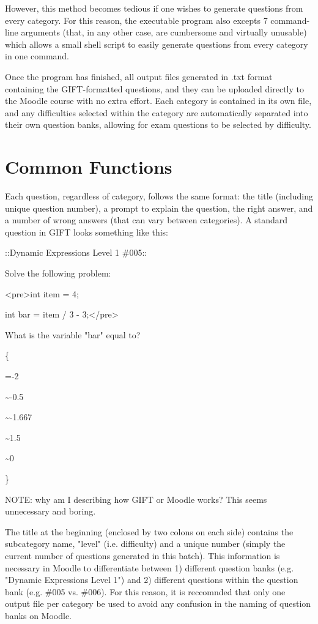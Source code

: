 \documentclass{article}
\begin{document}
However, this method becomes tedious if one wishes to generate questions from every category. For this reason, the
executable program also excepts 7 command-line arguments (that, in any other case, are cumbersome and virtually
unusable) which allows a small shell script to easily generate questions from every category in one command.

Once the program has finished, all output files generated in .txt format containing the GIFT-formatted questions, and they can be uploaded
directly to the Moodle course with no extra effort. Each category is contained in its own file, and any
difficulties selected within the category are automatically separated into their own question banks, allowing
for exam questions to be selected by difficulty.


\section{Common Functions}

Each question, regardless of category, follows the same format: the title (including unique question number),
a prompt to explain the question, the right answer, and a number of wrong answers (that can vary between categories).
A standard question in GIFT looks something like this:

\hfill \par
::Dynamic Expressions Level 1 \#005:: \par
Solve the following problem: \par
\textless pre\textgreater int item = 4; \par
int bar = item / 3 - 3;\textless /pre\textgreater \par
What is the variable "bar" equal to? \par
	\{ \par
	=-2 \par
	\~{}-0.5 \par
	\~{}-1.667 \par
	\~{}1.5 \par
	\~{}0 \par
	\}
\hfill \par

NOTE: why am I describing how GIFT or Moodle works? This seems unnecessary and boring.

The title at the beginning (enclosed by two colons on each side) contains the subcategory name, "level" (i.e. difficulty) and a unique number (simply the current number
of questions generated in this batch). This information is necessary in Moodle to differentiate between 1) different question banks (e.g. "Dynamic Expressions Level 1") and
2) different questions within the question bank (e.g. \#005 vs. \#006). For this reason, it is reccomnded that only one output file per category be used to avoid any confusion
in the naming of question banks on Moodle.
\end{document}

